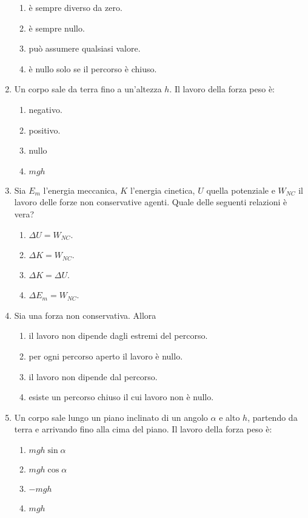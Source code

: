 \documentclass{article}
\begin{document}
\begin{enumerate}
\begin{enumerate}[label=\Alph*.]
    \item è sempre diverso da zero.
    \item è sempre nullo.
    \item può assumere qualsiasi valore.
    \item è nullo solo se il percorso è chiuso.
  \end{enumerate}
  \item Un corpo sale da terra fino a un'altezza $h$. Il lavoro della forza peso è:
  \begin{enumerate}[label=\Alph*.]
    \item negativo.
    \item positivo.
    \item nullo
    \item $mgh$
  \end{enumerate}
  \item Sia $E_m$ l'energia meccanica, $K$ l'energia cinetica, $U$ quella potenziale e $W_{NC}$ il lavoro delle forze non conservative agenti. Quale delle seguenti relazioni è vera?
  \begin{enumerate}[label=\Alph*.]
    \item $\Delta U=W_{NC}$.
    \item $\Delta K=W_{NC}.$
    \item $\Delta K = \Delta U$.
    \item $\Delta E_m=W_{NC}$.
  \end{enumerate}
  \item Sia  una forza non conservativa. Allora
  \begin{enumerate}[label=\Alph*.]
    \item il lavoro non dipende dagli estremi del percorso.
    \item per ogni percorso aperto il lavoro è nullo.
    \item il lavoro non dipende dal percorso.
    \item esiste un percorso chiuso il cui lavoro non è nullo.
  \end{enumerate}
  \item Un corpo sale lungo un piano inclinato di un angolo $\alpha$ e alto $h$, partendo da terra e arrivando fino alla cima del piano. Il lavoro della forza peso è:
  \begin{enumerate}[label=\Alph*.]
    \item $mgh\sin\alpha$
    \item $mgh\cos\alpha$
    \item $-mgh$
    \item $mgh$

\end{enumerate}
\end{enumerate}
\end{document}
